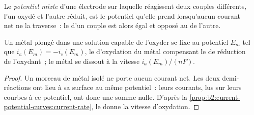 \begin{definition}\label{def:b2:batteries-electrolysis:mixed-potential}
Le \emph{potentiel mixte} d'une électrode sur laquelle réagissent deux
couples différents, l'un oxydé et l'autre réduit, est le potentiel qu'elle
prend lorsqu'aucun courant net ne la traverse~: le  d'un couple est alors
égal et opposé au  de l'autre.
\end{definition}

\begin{proposition}\label{prop:b2:batteries-electrolysis:mixed}
Un métal plongé dans une solution capable de l'oxyder se fixe au potentiel
$E_m$ tel que $i_a(E_m) = -i_c(E_m)$, le  d'oxydation du métal
compensant le  de réduction de l'oxydant~; le
métal se dissout à la vitesse $i_a(E_m)/(nF)$.
\end{proposition}

\begin{proof}
Un morceau de métal isolé ne porte aucun courant net. Les deux demi-réactions ont lieu
à sa surface au même potentiel~: leurs courants, lus sur leurs courbes
à ce potentiel, ont donc une somme nulle. D'après la \cref{prop:b2:current-potential-curves:current-rate},
le  donne la vitesse d'oxydation.
\end{proof}

